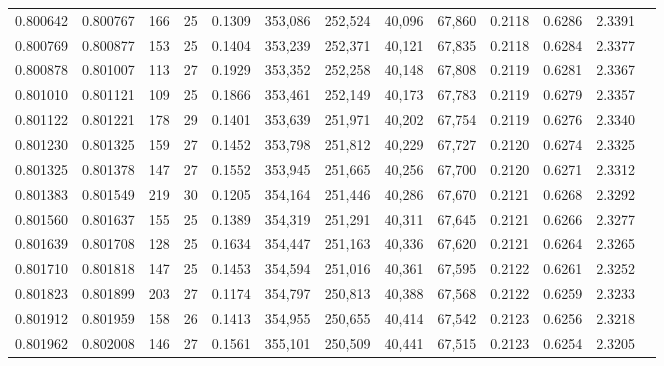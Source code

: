 \begin{tabular}{rrrrrrrrrrrrr}
0.800642 & 0.800767 &   166 &  25 &                                     0.1309 & 353,086 & 252,524 &  40,096 &  67,860 & 0.2118 & 0.6286 & 2.3391 \\
0.800769 & 0.800877 &   153 &  25 &                                     0.1404 & 353,239 & 252,371 &  40,121 &  67,835 & 0.2118 & 0.6284 & 2.3377 \\
0.800878 & 0.801007 &   113 &  27 &                                     0.1929 & 353,352 & 252,258 &  40,148 &  67,808 & 0.2119 & 0.6281 & 2.3367 \\
0.801010 & 0.801121 &   109 &  25 &                                     0.1866 & 353,461 & 252,149 &  40,173 &  67,783 & 0.2119 & 0.6279 & 2.3357 \\
0.801122 & 0.801221 &   178 &  29 &                                     0.1401 & 353,639 & 251,971 &  40,202 &  67,754 & 0.2119 & 0.6276 & 2.3340 \\
0.801230 & 0.801325 &   159 &  27 &                                     0.1452 & 353,798 & 251,812 &  40,229 &  67,727 & 0.2120 & 0.6274 & 2.3325 \\
0.801325 & 0.801378 &   147 &  27 &                                     0.1552 & 353,945 & 251,665 &  40,256 &  67,700 & 0.2120 & 0.6271 & 2.3312 \\
0.801383 & 0.801549 &   219 &  30 &                                     0.1205 & 354,164 & 251,446 &  40,286 &  67,670 & 0.2121 & 0.6268 & 2.3292 \\
0.801560 & 0.801637 &   155 &  25 &                                     0.1389 & 354,319 & 251,291 &  40,311 &  67,645 & 0.2121 & 0.6266 & 2.3277 \\
0.801639 & 0.801708 &   128 &  25 &                                     0.1634 & 354,447 & 251,163 &  40,336 &  67,620 & 0.2121 & 0.6264 & 2.3265 \\
0.801710 & 0.801818 &   147 &  25 &                                     0.1453 & 354,594 & 251,016 &  40,361 &  67,595 & 0.2122 & 0.6261 & 2.3252 \\
0.801823 & 0.801899 &   203 &  27 &                                     0.1174 & 354,797 & 250,813 &  40,388 &  67,568 & 0.2122 & 0.6259 & 2.3233 \\
0.801912 & 0.801959 &   158 &  26 &                                     0.1413 & 354,955 & 250,655 &  40,414 &  67,542 & 0.2123 & 0.6256 & 2.3218 \\
0.801962 & 0.802008 &   146 &  27 &                                     0.1561 & 355,101 & 250,509 &  40,441 &  67,515 & 0.2123 & 0.6254 & 2.3205 \\

\end{tabular}
